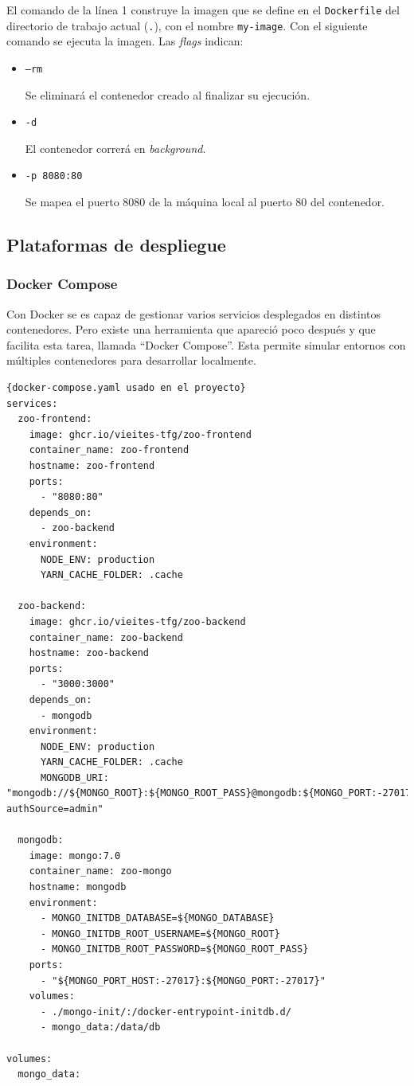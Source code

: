 El comando de la línea 1 construye la imagen que se define en el \texttt{Dockerfile} del directorio de trabajo actual (\texttt{.}), con el nombre \texttt{my-image}. Con el siguiente comando se ejecuta la imagen. Las \textit{flags} indican:

\begin{itemize}
  \item \texttt{--rm}

    Se eliminará el contenedor creado al finalizar su ejecución.

  \item \texttt{-d}

    El contenedor correrá en \textit{background}.

  \item \texttt{-p 8080:80}

    Se mapea el puerto 8080 de la máquina local al puerto 80 del contenedor.
\end{itemize}

\subsection*{Plataformas de despliegue}

\subsubsection*{Docker Compose}

Con Docker se es capaz de gestionar varios servicios desplegados en distintos contenedores. Pero existe una herramienta que apareció poco después y que facilita esta tarea, llamada ``Docker Compose''\cite{docker-compose}. Esta permite simular entornos con múltiples contenedores para desarrollar localmente.

\begin{lstlisting}[language=docker-compose,label=lst:dockercompose]{docker-compose.yaml usado en el proyecto}
services:
  zoo-frontend:
    image: ghcr.io/vieites-tfg/zoo-frontend
    container_name: zoo-frontend
    hostname: zoo-frontend
    ports:
      - "8080:80"
    depends_on:
      - zoo-backend
    environment:
      NODE_ENV: production
      YARN_CACHE_FOLDER: .cache

  zoo-backend:
    image: ghcr.io/vieites-tfg/zoo-backend
    container_name: zoo-backend
    hostname: zoo-backend
    ports:
      - "3000:3000"
    depends_on:
      - mongodb
    environment:
      NODE_ENV: production
      YARN_CACHE_FOLDER: .cache
      MONGODB_URI: "mongodb://${MONGO_ROOT}:${MONGO_ROOT_PASS}@mongodb:${MONGO_PORT:-27017}/${MONGO_DATABASE}?authSource=admin"

  mongodb:
    image: mongo:7.0
    container_name: zoo-mongo
    hostname: mongodb
    environment:
      - MONGO_INITDB_DATABASE=${MONGO_DATABASE}
      - MONGO_INITDB_ROOT_USERNAME=${MONGO_ROOT}
      - MONGO_INITDB_ROOT_PASSWORD=${MONGO_ROOT_PASS}
    ports:
      - "${MONGO_PORT_HOST:-27017}:${MONGO_PORT:-27017}"
    volumes:
      - ./mongo-init/:/docker-entrypoint-initdb.d/
      - mongo_data:/data/db

volumes:
  mongo_data:
\end{lstlisting}

